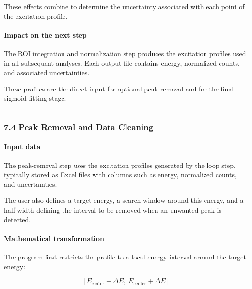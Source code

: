 These effects combine to determine the uncertainty associated with each
point of the excitation profile.

\hypertarget{impact-on-the-next-step-2}{%
\paragraph{Impact on the next step}\label{impact-on-the-next-step-2}}

The ROI integration and normalization step produces the excitation
profiles used in all subsequent analyses. Each output file contains
energy, normalized counts, and associated uncertainties.

These profiles are the direct input for optional peak removal and for
the final sigmoid fitting stage.

\begin{center}\rule{0.5\linewidth}{0.5pt}\end{center}

\hypertarget{peak-removal-and-data-cleaning}{%
\subsubsection{7.4 Peak Removal and Data
Cleaning}\label{peak-removal-and-data-cleaning}}

\hypertarget{input-data-3}{%
\paragraph{Input data}\label{input-data-3}}

The peak-removal step uses the excitation profiles generated by the loop
step, typically stored as Excel files with columns such as energy,
normalized counts, and uncertainties.

The user also defines a target energy, a search window around this
energy, and a half-width defining the interval to be removed when an
unwanted peak is detected.

\hypertarget{mathematical-transformation-3}{%
\paragraph{Mathematical
transformation}\label{mathematical-transformation-3}}

The program first restricts the profile to a local energy interval
around the target energy:

\[
[E_{\mathrm{center}} - \Delta E,\; E_{\mathrm{center}} + \Delta E]
\]

